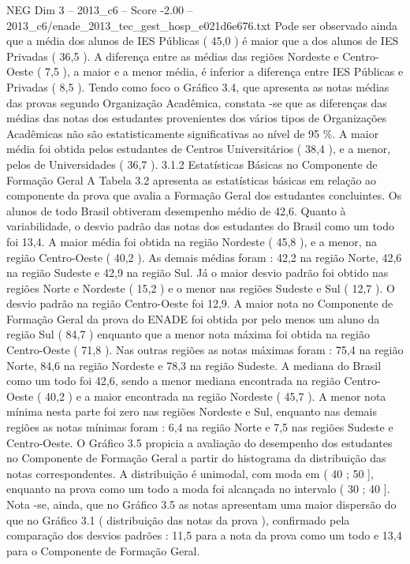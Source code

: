 \begin{textsample}{NEG Dim 3 – 2013\_c6 – Score -2.00 – 2013\_c6/enade\_2013\_tec\_gest\_hosp\_e021d6e676.txt}
Pode ser observado ainda que a média dos alunos de IES Públicas ( 45,0 ) é maior que a dos alunos de IES Privadas ( 36,5 ).
A diferença entre as médias das regiões Nordeste e Centro-Oeste ( 7,5 ), a maior e a menor média, é inferior a diferença entre IES Públicas e Privadas ( 8,5 ).
Tendo como foco o Gráfico 3.4, que apresenta as notas médias das provas segundo Organização Acadêmica, constata -se que as diferenças das médias das notas dos estudantes provenientes dos vários tipos de Organizações Acadêmicas não são estatisticamente significativas ao nível de 95 \%.
A maior média foi obtida pelos estudantes de Centros Universitários ( 38,4 ), e a menor, pelos de Universidades ( 36,7 ). 3.1.2 Estatísticas Básicas no Componente de Formação Geral A Tabela 3.2 apresenta as estatísticas básicas em relação ao componente da prova que avalia a Formação Geral dos estudantes concluintes.
Os alunos de todo Brasil obtiveram desempenho médio de 42,6.
Quanto à variabilidade, o desvio padrão das notas dos estudantes do Brasil como um todo foi 13,4.
A maior média foi obtida na região Nordeste ( 45,8 ), e a menor, na região Centro-Oeste ( 40,2 ).
As demais médias foram : 42,2 na região Norte, 42,6 na região Sudeste e 42,9 na região Sul.
Já o maior desvio padrão foi obtido nas regiões Norte e Nordeste ( 15,2 ) e o menor nas regiões Sudeste e Sul ( 12,7 ).
O desvio padrão na região Centro-Oeste foi 12,9.
A maior nota no Componente de Formação Geral da prova do ENADE foi obtida por pelo menos um aluno da região Sul ( 84,7 ) enquanto que a menor nota máxima foi obtida na região Centro-Oeste ( 71,8 ).
Nas outras regiões as notas máximas foram : 75,4 na região Norte, 84,6 na região Nordeste e 78,3 na região Sudeste.
A mediana do Brasil como um todo foi 42,6, sendo a menor mediana encontrada na região Centro-Oeste ( 40,2 ) e a maior encontrada na região Nordeste ( 45,7 ).
A menor nota mínima nesta parte foi zero nas regiões Nordeste e Sul, enquanto nas demais regiões as notas mínimas foram : 6,4 na região Norte e 7,5 nas regiões Sudeste e Centro-Oeste.
O Gráfico 3.5 propicia a avaliação do desempenho dos estudantes no Componente de Formação Geral a partir do histograma da distribuição das notas correspondentes.
A distribuição é unimodal, com moda em ( 40 ; 50 ], enquanto na prova como um todo a moda foi alcançada no intervalo ( 30 ; 40 ].
Nota -se, ainda, que no Gráfico 3.5 as notas apresentam uma maior dispersão do que no Gráfico 3.1 ( distribuição das notas da prova ), confirmado pela comparação dos desvios padrões : 11,5 para a nota da prova como um todo e 13,4 para o Componente de Formação Geral.

\end{textsample}
